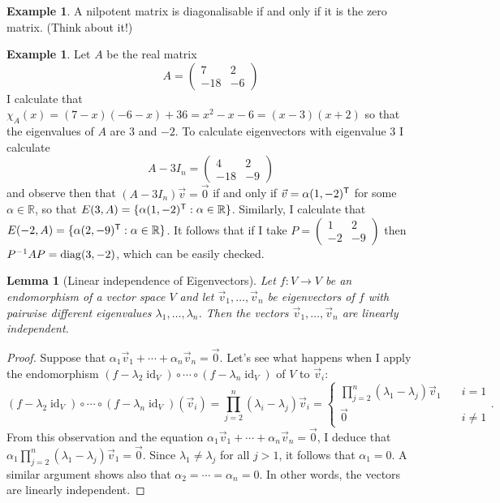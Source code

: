 \documentclass[11pt]{amsbook}
\DeclareMathOperator{\id}{\mathrm{id}}
\newtheorem{lemma}[theorem]{Lemma}
\theoremstyle{definition}
\newtheorem{ex}[theorem]{Example}
\begin{document}
\begin{ex}
A nilpotent matrix is diagonalisable if and only if it is the zero matrix. (Think about it!)
\end{ex}

\begin{ex}
Let $A$ be the real matrix $$A = \begin{pmatrix} 7 & 2 \\ -18 & -6 \end{pmatrix}$$ I calculate that $\chi_A(x) = (7-x)(-6 -x) + 36  = x^2 - x - 6 = (x-3)(x+2)$ so that the eigenvalues of $A$ are $3$ and $-2$. To calculate eigenvectors with eigenvalue $3$ I calculate $$A - 3I_n = \begin{pmatrix} 4 & 2 \\ -18 & -9 \end{pmatrix}$$ and observe then that $(A- 3I_n){\vec v} = \vec{0}$ if and only if $\vec{v} = \alpha (1, -2)^{\sf T}$ for some $\alpha \in \mathbb{R}$, so that $E(3, A) = \{ \alpha (1,-2)^{\sf T} : \alpha \in \mathbb{R} \}$. Similarly, I calculate that $E(-2, A) = \{ \alpha (2, -9)^{\sf T}: \alpha \in \mathbb{R} \}$. It follows that if I take $P = \begin{pmatrix} 1 & 2 \\ -2 & -9 \end{pmatrix}$ then $P^{-1}AP = {\rm diag}(3,-2)$, which can be easily checked.
\end{ex}

\begin{lemma}[Linear independence of Eigenvectors] \label{diageval} Let $f:V\to V$ be an endomorphism of a vector space $V$ and let $\vec{v}_1, \ldots , \vec{v}_n$ be eigenvectors of $f$ with pairwise different eigenvalues $\lambda_1, \ldots , \lambda_n$. Then the vectors $\vec{v}_1, \ldots , \vec{v}_n$ are linearly independent.
\end{lemma}

\begin{proof}
Suppose that $\alpha_1 \vec{v}_1 + \cdots + \alpha_n\vec{v}_n = \vec{0}$. Let's see what happens when I apply the endomorphism $(f-\lambda_2 \id_V) \circ \cdots \circ (f-\lambda_n \id_V)$ of $V$ to $\vec{v}_i$:
$$(f-\lambda_2 \id_V) \circ \cdots \circ (f-\lambda_n \id_V) (\vec{v}_i) = \prod_{j=2}^n (\lambda_i -\lambda_j) \vec{v}_i = \begin{cases} \prod_{j=2}^n (\lambda_1 -\lambda_j) \vec{v}_1 \quad & i=1 \\ \vec{0} & i\neq 1 \end{cases}.$$ From this observation and the equation $\alpha_1 \vec{v}_1 + \cdots + \alpha_n\vec{v}_n = \vec{0}$, I deduce that $\alpha_1  \prod_{j=2}^n (\lambda_1 -\lambda_j) \vec{v}_1 = \vec{0}$. Since $\lambda_1 \neq \lambda_j$ for all $j>1$, it follows that $\alpha_1=0$. A similar argument shows also that $\alpha_2 = \cdots = \alpha_n = 0$. In other words, the vectors are linearly independent.
\end{proof}
\end{document}
